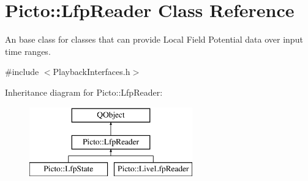 \hypertarget{class_picto_1_1_lfp_reader}{\section{Picto\-:\-:Lfp\-Reader Class Reference}
\label{class_picto_1_1_lfp_reader}
}


An base class for classes that can provide Local Field Potential data over input time ranges.  




{\ttfamily \#include $<$Playback\-Interfaces.\-h$>$}

Inheritance diagram for Picto\-:\-:Lfp\-Reader\-:\begin{figure}[H]
\begin{center}
\leavevmode
\includegraphics[height=3.000000cm]{class_picto_1_1_lfp_reader}
\end{center}
\end{figure}
